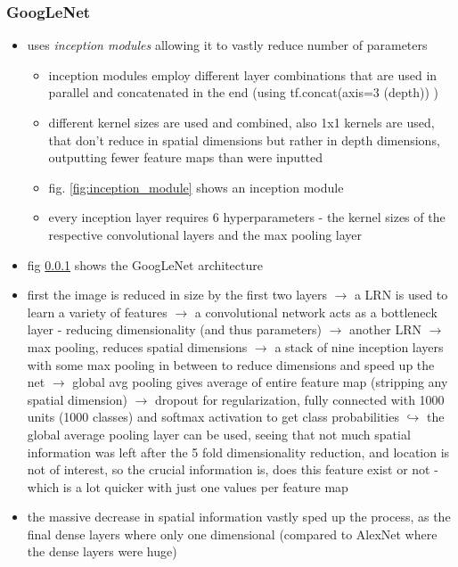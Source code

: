 \documentclass[12pt,a4paper]{article}
\begin{document}
\subsubsection{GoogLeNet} %
\label{ssub:googlenet}
\begin{itemize}
  \item uses \textit{inception modules} allowing it to vastly reduce number of parameters
  \begin{itemize}
    \item inception modules employ different layer combinations that are used in parallel and concatenated in the end (using tf.concat(axis=3 (depth)) )
    \item different kernel sizes are used and combined, also 1x1 kernels are used, that don't reduce in spatial dimensions but rather in depth dimensions, outputting fewer feature maps than were inputted
    \item fig. \ref{fig:inception_module} shows an inception module
    \item every inception layer requires 6 hyperparameters - the kernel sizes of the respective convolutional layers and the max pooling layer
  \end{itemize}
  \item fig \ref{ssub:googlenet} shows the GoogLeNet architecture
  \item first the image is reduced in size by the first two layers 
  \newline \indent $\longrightarrow$ a LRN is used to learn a variety of features 
  \newline \indent $\longrightarrow$ a convolutional network acts as a bottleneck layer - reducing dimensionality (and thus parameters) 
  \newline \indent $\longrightarrow$ another LRN 
  \newline \indent $\longrightarrow$ max pooling, reduces spatial dimensions 
  \newline \indent $\longrightarrow$ a stack of nine inception layers with some max pooling in between to reduce dimensions and speed up the net 
  \newline \indent $\longrightarrow$ global avg pooling gives average of entire feature map (stripping any spatial dimension) 
  \newline \indent $\longrightarrow$ dropout for regularization, fully connected with 1000 units (1000 classes) and softmax activation to get class probabilities
  \newline \indent $\hookrightarrow$ the global average pooling layer can be used, seeing that not much spatial information was left after the 5 fold dimensionality reduction, and location is not of interest, so the crucial information is, does this feature exist or not - which is a lot quicker with just one values per feature map
  \item the massive decrease in spatial information vastly sped up the process, as the final dense layers where only one dimensional (compared to AlexNet where the dense layers were huge) 
\end{itemize}
\end{document}
